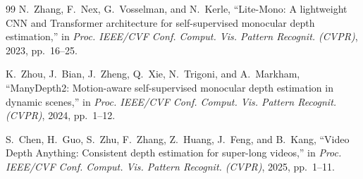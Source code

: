 \documentclass[10pt,twocolumn,letterpaper]{article}
\begin{document}
\begin{thebibliography}{99}
N.~Zhang, F.~Nex, G.~Vosselman, and N.~Kerle, ``Lite-Mono: A lightweight CNN and Transformer architecture for self-supervised monocular depth estimation,'' in \textit{Proc. IEEE/CVF Conf. Comput. Vis. Pattern Recognit. (CVPR)}, 2023, pp.~16--25.

K.~Zhou, J.~Bian, J.~Zheng, Q.~Xie, N.~Trigoni, and A.~Markham, ``ManyDepth2: Motion-aware self-supervised monocular depth estimation in dynamic scenes,'' in \textit{Proc. IEEE/CVF Conf. Comput. Vis. Pattern Recognit. (CVPR)}, 2024, pp.~1--12.

S.~Chen, H.~Guo, S.~Zhu, F.~Zhang, Z.~Huang, J.~Feng, and B.~Kang, ``Video Depth Anything: Consistent depth estimation for super-long videos,'' in \textit{Proc. IEEE/CVF Conf. Comput. Vis. Pattern Recognit. (CVPR)}, 2025, pp.~1--11.

\end{thebibliography}
\end{document}
